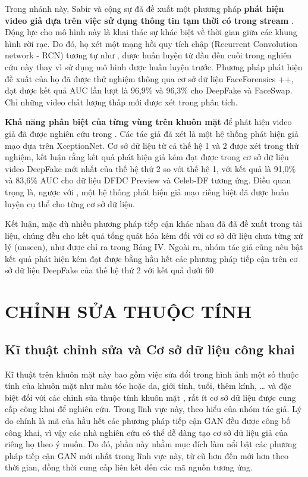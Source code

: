 \documentclass{article}
\begin{document}
Trong nhánh này, Sabir và cộng sự đã đề xuất một phương pháp \textbf{phát hiện video giả dựa trên việc sử dụng thông tin tạm thời có trong stream} . Động lực cho mô hình này là khai thác sự khác biệt về thời gian giữa các khung hình rời rạc. Do đó, họ xét một mạng hồi quy tích chập (Recurrent Convolution network - RCN) tương tự như , được huấn luyện từ đầu đến cuối trong nghiên cứu này thay vì sử dụng mô hình được huấn luyện trước. Phương pháp phát hiện đề xuất của họ đã được thử nghiệm thông qua cơ sở dữ liệu FaceForensics ++, đạt được kết quả AUC lần lượt là 96,9\% và 96,3\% cho DeepFake và FaceSwap. Chỉ những video chất lượng thấp mới được xét trong phân tích.

\textbf{Khả năng phân biệt của từng vùng trên khuôn mặt} để phát hiện video giả đã được nghiên cứu trong . Các tác giả đã xét là một hệ thống phát hiện giả mạo dựa trên XceptionNet. Cơ sở dữ liệu từ cả thế hệ 1 và 2 được xét trong thử nghiệm, kết luận rằng kết quả phát hiện giả kém đạt được trong cơ sở dữ liệu video DeepFake mới nhất của thế hệ thứ 2 so với thế hệ 1, với kết quả là 91,0\% và 83,6\% AUC cho dữ liệu DFDC Preview và Celeb-DF tương ứng. Điều quan trọng là, ngược với , một hệ thống phát hiện giả mạo riêng biệt đã được huấn luyện cụ thể cho từng cơ sở dữ liệu.

Kết luận, mặc dù nhiều phương pháp tiếp cận khác nhau đã đã đề xuất trong tài liệu, chúng đều cho kết quả tổng quát hóa kém đối với cơ sở dữ liệu chưa từng xử lý (unseen), như được chỉ ra trong Bảng IV. Ngoài ra, nhóm tác giả cũng nêu bật kết quả phát hiện kém đạt được bằng hầu hết các phương pháp tiếp cận trên cơ sở dữ liệu DeepFake của thế hệ thứ 2 với kết quả dưới 60%

\section{CHỈNH SỬA THUỘC TÍNH} \label{sec:5-attribute-manipulation}

\subsection{Kĩ thuật chỉnh sửa và Cơ sở dữ liệu công khai} \label{sec:5-a-technique}

Kĩ thuật trên khuôn mặt này bao gồm việc sửa đổi trong hình ảnh một số thuộc tính của khuôn mặt như màu tóc hoặc da, giới tính, tuổi, thêm kính, … và đặc biệt đối với các chỉnh sửa thuộc tính khuôn mặt , rất ít cơ sở dữ liệu được cung cấp công khai để nghiên cứu. Trong lĩnh vực này, theo hiểu của nhóm tác giả. Lý do chính là mã của hầu hết các phương pháp tiếp cận GAN đều được công bố công khai, vì vậy các nhà nghiên cứu có thể dễ dàng tạo cơ sở dữ liệu giả của riêng họ theo ý muốn. Do đó, phần này nhằm mục đích làm nổi bật các phương pháp tiếp cận GAN mới nhất trong lĩnh vực này, từ cũ hơn đến mới hơn theo thời gian, đồng thời cung cấp liên kết đến các mã nguồn tương ứng.
\end{document}
